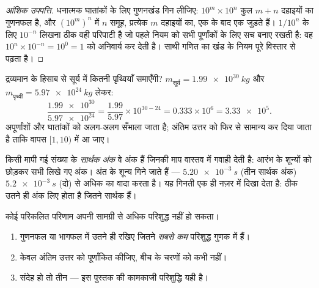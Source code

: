 \begin{proof}[आंशिक उपपत्ति]
धनात्मक घातांकों के लिए गुणनखंड गिन लीजिए: $10^{m} \times 10^{n}$ कुल $m + n$
दहाइयों का गुणनफल है, और $(10^m)^n$ में $n$ समूह, प्रत्येक $m$
दहाइयों का, एक के बाद एक जुड़ते हैं। $1/10^{n}$ के लिए $10^{-n}$ लिखना ठीक वही
परिपाटी है जो पहले नियम को सभी पूर्णांकों के लिए सच बनाए रखती है: वह
$10^{n} \times 10^{-n} = 10^{0} = 1$ को अनिवार्य कर देती है। साथी गणित का खंड  के नियम
पूरे विस्तार से पढ़ता है।
\end{proof}

\begin{example}[वैज्ञानिक संकेतन में गुणा]\label{ex:g10:orders-of-magnitude:scinot}
द्रव्यमान के हिसाब से सूर्य में कितनी पृथ्वियाँ समाएँगी? $m_{\text{सूर्य}} = \qty{1.99e30}{kg}$ और
$m_{\text{पृथ्वी}} = \qty{5.97e24}{kg}$ लेकर:
\[
\frac{\num{1.99e30}}{\num{5.97e24}}
= \frac{1.99}{5.97} \times 10^{30-24}
= 0.333 \times 10^{6}
= \num{3.33e5}.
\]
अपूर्णांशों और घातांकों को अलग-अलग सँभाला जाता है; अंतिम
उत्तर को फिर से सामान्य कर दिया जाता है ताकि  वापस
$[1, 10)$ में आ जाए।
\end{example}

\begin{definition}[सार्थक अंक]\label{def:g10:orders-of-magnitude:sigfig}
किसी मापी गई संख्या के \emph{सार्थक अंक} वे अंक हैं
जिनकी माप वास्तव में गवाही देती है: आरंभ के शून्यों को छोड़कर सभी लिखे
गए अंक। अंत के शून्य गिने जाते हैं --- $\qty{5.20e-3}{s}$ (तीन सार्थक अंक) $\qty{5.2e-3}{s}$
(दो) से अधिक का वादा करता है।  यह गिनती एक ही
नज़र में दिखा देता है:  ठीक उतने ही अंक लिए होता है
जितने सार्थक हैं।
\end{definition}

\begin{method}[कितने अंक रखें]\label{met:g10:orders-of-magnitude:sigfig}
कोई परिकलित परिणाम अपनी सामग्री से अधिक परिशुद्ध नहीं हो सकता।
\begin{enumerate}
  \item गुणनफल या भागफल में उतने ही  रखिए जितने
        \emph{सबसे कम} परिशुद्ध गुणक में हैं।
  \item केवल अंतिम उत्तर को पूर्णांकित कीजिए, बीच के चरणों को कभी नहीं।
  \item संदेह हो तो तीन  --- इस पुस्तक की कामकाजी
        परिशुद्धि यही है।
\end{enumerate}
\end{method}

